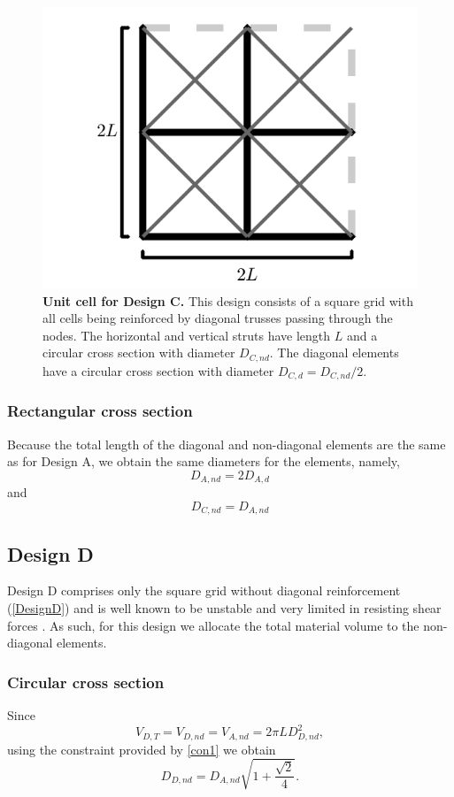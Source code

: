 \documentclass[10pt,twoside]{fernandes_supp}
\begin{document}
\begin{figure}[H]
    \centering
    \includegraphics[width=0.4\linewidth]{SFig4.png}
    \caption{{\bf Unit cell for Design C.} This design consists of a square grid with all cells being reinforced by diagonal trusses passing through the nodes.  The horizontal and vertical struts have length $L$ and a circular cross section with diameter $D_{C,nd}$. The diagonal elements have a circular cross section  with diameter $D_{C,d}={D_{C,nd}}/{2}$.}
    \label{DesignC}
\end{figure}

\subsubsection{Rectangular cross section}
Because the total length of the diagonal and non-diagonal elements are the same as for Design A, we obtain the same diameters for the elements, namely,
\begin{equation}
D_{A,nd}=2D_{A,d}
\end{equation}
and
\begin{equation}
D_{C,nd}=D_{A,nd}
\end{equation}

\subsection{Design D} 
Design D comprises only the square grid without diagonal reinforcement (\cref{DesignD}) and is well known to be unstable and very limited in resisting shear forces \citep{gibson1999,deshpande2001}. As such, for this design we allocate the total material volume to the non-diagonal elements.

\subsubsection{Circular cross section}
Since
\begin{equation}
V_{D,T}=V_{D,nd}=V_{A,nd}=2\pi L D_{D,nd}^2,
\end{equation}
using the constraint provided by \cref{con1} we obtain
\begin{equation}
{D_{D,nd}}={D_{A,nd}}\sqrt{1+\frac{\sqrt{2}}{4}}. 
\end{equation}
\end{document}
